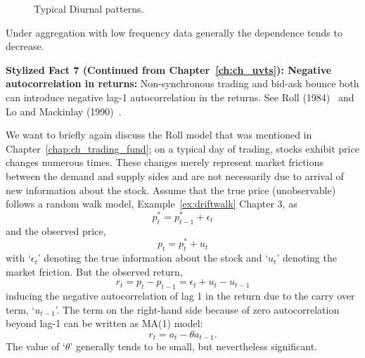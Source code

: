 	\begin{figure}[!ht]
	\centering
	\caption{Typical Diurnal patterns.\label{fig:diurnal}}
	\end{figure}


Under aggregation with low frequency data generally the dependence tends to decrease. \twomedskip


\noindent\textbf{Stylized Fact 7 (Continued from Chapter~\ref{ch:ch_uvts}): Negative autocorrelation in returns:} Non-synchronous trading and bid-ask bounce both can introduce negative lag-1 autocorrelation in the returns. See Roll (1984)~\cite{roll1984} and Lo and Mackinlay (1990)~\cite{lo1990}.\twomedskip


We want to briefly again discuss the Roll model that was mentioned in Chapter~\ref{chap:ch_trading_fund}; on a typical day of trading, stocks exhibit price changes numerous times. These changes merely represent market frictions between the demand and supply sides and are not necessarily due to arrival of new information about the stock. Assume that the true price (unobservable) follows a random walk model, Example~\ref{ex:driftwalk} Chapter 3, as
	\begin{equation} \label{eqn:2plowstar}
	p_t^*=p_{t-1}^* + \epsilon_t 
	\end{equation}
and the observed price,
	\begin{equation} \label{eqn:2lowpstar}
	p_t = p_t^* + u_t
	\end{equation}
with `$\epsilon_t$' denoting the true information about the stock and `$u_t$' denoting the market friction. But the observed return,
	\begin{equation} \label{eqn:2firstrtlow}
	r_t=p_t-p_{t-1} = \epsilon_t + u_t - u_{t-1}
	\end{equation}
inducing the negative autocorrelation of lag 1 in the return due to the carry over term, `$u_{t-1}$'. The term on the right-hand side because of zero autocorrelation beyond lag-1 can be written as MA(1) model:
	\begin{equation} \label{eqn:2lowrt}
	r_t=a_t - \theta a_{t-1}.
	\end{equation}
The value of `$\theta$' generally tends to be small, but nevertheless significant. \twomedskip


